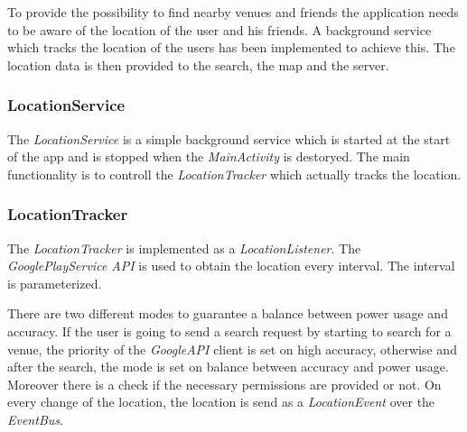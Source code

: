 To provide the possibility to find nearby venues and friends the application needs to be aware of the location of the user and his friends. A background service which tracks the location of the users has been implemented to achieve this. The location data is then provided to the search, the map and the server.

\subsubsection{LocationService}
The \textit{LocationService} is a simple background service which is started at the start of the app and is stopped when the \textit{MainActivity} is destoryed. The main functionality is to controll the \textit{LocationTracker} which actually tracks the location.

\subsubsection{LocationTracker}
The \textit{LocationTracker} is implemented as a \textit{LocationListener}. The \textit{GooglePlayService API} is used to obtain the location every interval. The interval is parameterized.

There are two different modes to guarantee a balance between power usage and accuracy. If the user is going to send a search request by starting to search for a venue, the priority of the \textit{GoogleAPI} client is set on high accuracy, otherwise and after the search, the mode is set on balance between accuracy and power usage. Moreover there is a check if the necessary permissions are provided or not. On every change of the location, the location is send as a \textit{LocationEvent} over the \textit{EventBus}. 

